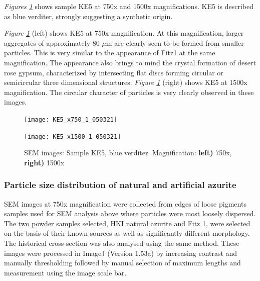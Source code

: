 
\textit{Figures \ref{fig:KE5_sem_1}} shows sample KE5 at 750x and 1500x magnifications. KE5 is described as blue verditer, strongly suggesting a synthetic origin.

\textit{Figure \ref{fig:KE5_sem_1}} (left) shows KE5 at 750x magnification. At this magnification, larger aggregates of approximately 80 $\mu$m are clearly seen to be formed from smaller particles. This is very similar to the appearance of Fitz1 at the same magnification. The appearance also brings to mind the crystal formation of desert rose gypsum, characterized by intersecting flat discs forming circular or semicircular three dimensional structures. \textit{Figure \ref{fig:KE5_sem_1}} (right) shows KE5 at 1500x magnification. The circular character of particles is very clearly observed in these images.


\begin{figure}[H]
\centering
\begin{minipage}{.45\textwidth}
  \centering
  \texttt{[image: KE5\_x750\_1\_050321]}
\end{minipage}
\begin{minipage}{.45\textwidth}
  \centering
  \texttt{[image: KE5\_x1500\_1\_050321]}
\end{minipage}
\caption[SEM images: Sample KE5, blue verditer]{SEM images: Sample KE5, blue verditer. Magnification: \textbf{left)} 750x, \textbf{right)} 1500x}
\label{fig:KE5_sem_1}
\end{figure}

\subsubsection[Particle size distribution of natural and artificial azurite]{Particle size distribution of natural and artificial azurite}
\label{subsubsection3.1.1.1}

SEM images at 750x magnification were collected from edges of loose pigments samples used for SEM analysis above where particles were most loosely dispersed. The two powder samples selected, HKI natural azurite and Fitz 1, were selected on the basis of their known sources as well as significantly different morphology. The historical cross section was also analysed using the same method. These images were processed in ImageJ (Version 1.53a) by increasing contrast and manually thresholding followed by manual selection of maximum lengths and measurement using the image scale bar. 


